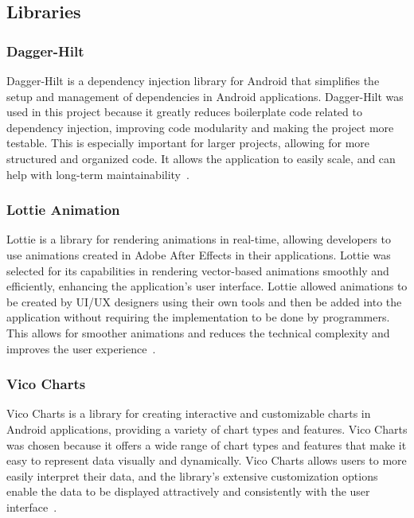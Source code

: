 \subsection{Libraries}

\subsubsection{Dagger-Hilt}
\label{sec:daggerhilt}
Dagger-Hilt is a dependency injection library for Android that simplifies the setup and management of dependencies in Android applications. Dagger-Hilt was used in this project because it greatly reduces boilerplate code related to dependency injection, improving code modularity and making the project more testable. This is especially important for larger projects, allowing for more structured and organized code. It allows the application to easily scale, and can help with long-term maintainability~\cite{bib:daggerhilt}.

\subsubsection{Lottie Animation}
\label{sec:lottie}
Lottie is a library for rendering animations in real-time, allowing developers to use animations created in Adobe After Effects in their applications. Lottie was selected for its capabilities in rendering vector-based animations smoothly and efficiently, enhancing the application’s user interface. Lottie allowed animations to be created by UI/UX designers using their own tools and then be added into the application without requiring the implementation to be done by programmers. This allows for smoother animations and reduces the technical complexity and improves the user experience~\cite{bib:lottie}.

\subsubsection{Vico Charts}
\label{sec:vicocharts}
Vico Charts is a library for creating interactive and customizable charts in Android applications, providing a variety of chart types and features. Vico Charts was chosen because it offers a wide range of chart types and features that make it easy to represent data visually and dynamically. Vico Charts allows users to more easily interpret their data, and the library’s extensive customization options enable the data to be displayed attractively and consistently with the user interface~\cite{bib:vicocharts}.

